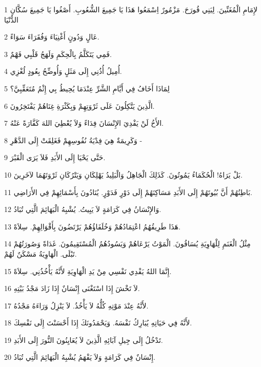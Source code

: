 \par 1 لإِمَامِ الْمُغَنِّينَ. لِبَنِي قُورَحَ. مَزْمُورٌ اِسْمَعُوا هَذَا يَا جَمِيعَ الشُّعُوبِ. أَصْغُوا يَا جَمِيعَ سُكَّانِ الدُّنْيَا
\par 2 عَالٍ وَدُونٍ أَغْنِيَاءَ وَفُقَرَاءَ سَوَاءً.
\par 3 فَمِي يَتَكَلَّمُ بِالْحِكَمِ وَلَهَجُ قَلْبِي فَهْمٌ.
\par 4 أُمِيلُ أُذُنِي إِلَى مَثَلٍ وَأُوضِّحُ بِعُودٍ لُغْزِي.
\par 5 لِمَاذَا أَخَافُ فِي أَيَّامِ الشَّرِّ عِنْدَمَا يُحِيطُ بِي إِثْمُ مُتَعَقِّبِيَّ؟
\par 6 الَّذِينَ يَتَّكِلُونَ عَلَى ثَرْوَتِهِمْ وَبِكَثْرَةِ غِنَاهُمْ يَفْتَخِرُونَ.
\par 7 الأَخُ لَنْ يَفْدِيَ الإِنْسَانَ فِدَاءً وَلاَ يُعْطِيَ اللهَ كَفَّارَةً عَنْهُ.
\par 8 وَكَرِيمَةٌ هِيَ فِدْيَةُ نُفُوسِهِمْ فَغَلِقَتْ إِلَى الدَّهْرِ -
\par 9 حَتَّى يَحْيَا إِلَى الأَبَدِ فَلاَ يَرَى الْقَبْرَ.
\par 10 بَلْ يَرَاهُ! الْحُكَمَاءُ يَمُوتُونَ. كَذَلِكَ الْجَاهِلُ وَالْبَلِيدُ يَهْلِكَانِ وَيَتْرُكَانِ ثَرْوَتَهُمَا لآخَرِينَ.
\par 11 بَاطِنُهُمْ أَنَّ بُيُوتَهُمْ إِلَى الأَبَدِ مَسَاكِنَهُمْ إِلَى دَوْرٍ فَدَوْرٍ. يُنَادُونَ بِأَسْمَائِهِمْ فِي الأَرَاضِي.
\par 12 وَالإِنْسَانُ فِي كَرَامَةٍ لاَ يَبِيتُ. يُشْبِهُ الْبَهَائِمَ الَّتِي تُبَادُ.
\par 13 هَذَا طَرِيقُهُمُ اعْتِمَادُهُمْ وَخُلَفَاؤُهُمْ يَرْتَضُونَ بِأَقْوَالِهِمْ. سِلاَهْ.
\par 14 مِثْلُ الْغَنَمِ لِلْهَاوِيَةِ يُسَاقُونَ. الْمَوْتُ يَرْعَاهُمْ وَيَسُودُهُمُ الْمُسْتَقِيمُونَ. غَدَاةً وَصُورَتُهُمْ تَبْلَى. الْهَاوِيَةُ مَسْكَنٌ لَهُمْ.
\par 15 إِنَّمَا اللهُ يَفْدِي نَفْسِي مِنْ يَدِ الْهَاوِيَةِ لأَنَّهُ يَأْخُذُنِي. سِلاَهْ.
\par 16 لاَ تَخْشَ إِذَا اسْتَغْنَى إِنْسَانٌ إِذَا زَادَ مَجْدُ بَيْتِهِ.
\par 17 لأَنَّهُ عِنْدَ مَوْتِهِ كُلُّهُ لاَ يَأْخُذُ. لاَ يَنْزِلُ وَرَاءَهُ مَجْدُهُ.
\par 18 لأَنَّهُ فِي حَيَاتِهِ يُبَارِكُ نَفْسَهُ. وَيَحْمَدُونَكَ إِذَا أَحْسَنْتَ إِلَى نَفْسِكَ.
\par 19 تَدْخُلُ إِلَى جِيلِ آبَائِهِ الَّذِينَ لاَ يُعَايِنُونَ النُّورَ إِلَى الأَبَدِ.
\par 20 إِنْسَانٌ فِي كَرَامَةٍ وَلاَ يَفْهَمُ يُشْبِهُ الْبَهَائِمَ الَّتِي تُبَادُ.

